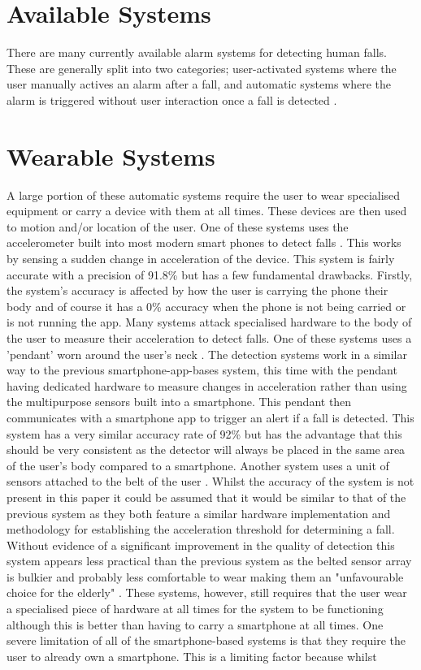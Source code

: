 \documentclass[11pt,a4paper]{report}
\begin{document}
\section{Available Systems}
There are many currently available alarm systems for detecting human falls. These are generally split into two categories; user-activated systems where the user manually actives an alarm after a fall, and automatic systems where the alarm is triggered without user interaction once a fall is detected \citep{Alwan_A_smart_and_passive_floor-vibration}. 

\section{Wearable Systems}
A large portion of these automatic systems require the user to wear specialised equipment or carry a device with them at all times. These devices are then used to motion and/or location of the user. One of these systems uses the accelerometer built into most modern smart phones to detect falls \citep{Tsinganos_A_smartphone-based_fall}. This works by sensing a sudden change in acceleration of the device. This system is fairly accurate with a precision of 91.8\% but has a few fundamental drawbacks. Firstly, the system's accuracy is affected by how the user is carrying the phone their body and of course it has a 0\% accuracy when the phone is not being carried or is not running the app. Many systems attack specialised hardware to the body of the user to measure their acceleration to detect falls. One of these systems uses a 'pendant' worn around the user's neck \citep{Santiago_Fall_detection_system}. The detection systems work in a similar way to the previous smartphone-app-bases system, this time with the pendant having dedicated hardware to measure changes in acceleration rather than using the multipurpose sensors built into a smartphone. This pendant then communicates with a smartphone app to trigger an alert if a fall is detected. This system has a very similar accuracy rate of 92\% but has the advantage that this should be very consistent as the detector will always be placed in the same area of the user's body compared to a smartphone. Another system uses a unit of sensors attached to the belt of the user \citep{Cruz_Fall_detection_wearable_device}. Whilst the accuracy of the system is not present in this paper it could be assumed that it would be similar to that of the previous system as they both feature a similar hardware implementation and methodology for establishing the acceleration threshold for determining a fall. Without evidence of a significant improvement in the quality of detection this system appears less practical than the previous system as the belted sensor array is bulkier and probably less comfortable to wear making them an "unfavourable choice for the elderly" \citep{fallDetectionInvestigation}. These systems, however, still requires that the user wear a specialised piece of hardware at all times for the system to be functioning although this is better than having to carry a smartphone at all times. One severe limitation of all of the smartphone-based systems is that they require the user to already own a smartphone. This is a limiting factor because whilst 
\end{document}
